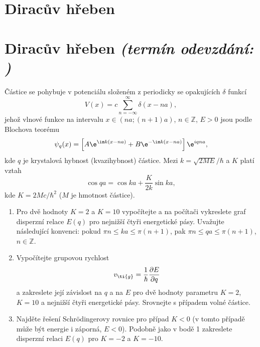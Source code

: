\documentclass[a4paper,11pt,twoside]{book}
\def\np{\newpage}
\newcommand{\exercise}[2][]{\ifthenelse{\isempty{#1}}
	{\np\section{#2}}
	{\np\section[#2]{{#2} \small{\it{(termín odevzdání: {#1})}}}}
}
\begin{document}
\exercise{Diracův hřeben}
    Částice se pohybuje v potenciálu složeném z periodicky se opakujících $\delta$ funkcí
    \begin{equation*}
        V(x)=c\sum_{n=-\infty}^{\infty}\delta(x-na),
    \end{equation*}
    jehož vlnové funkce na intervalu 
    $x\in\left(na; \left(n+1\right)a\right)$, $n\in\mathbb{Z}$, $E>0$ 
    jsou podle Blochova teorému
    \begin{equation*}
        \psi_{q}(x)
            =\left[A\e^{\im k\left(x-na\right)}+B\e^{-\im k\left(x-na\right)}\right]\e^{iqna},
    \end{equation*}
    kde $q$ je krystalová hybnost (kvazihybnost) částice.
    Mezi $k=\sqrt{2ME}/\hbar$ a $K$ platí vztah
    \begin{equation*}
        \cos{qa}=\cos{ka}+\frac{K}{2k}\sin{ka},
    \end{equation*}
    kde $K=2Mc/\hbar^{2}$ ($M$ je hmotnost částice).
    \begin{enumerate}
    \item 
        Pro dvě hodnoty $K=2$ a $K=10$ vypočítejte a na počítači vykreslete graf disperzní relace $E(q)$ pro nejnižší čtyři energetické pásy.
        Uvažujte následující konvenci: pokud $\pi n\leq ka\leq\pi(n+1)$, pak $\pi n\leq qa\leq\pi(n+1)$, $n\in\mathbb{Z}$.
    \item 
        Vypočítejte grupovou rychlost
        \begin{equation*}
            v_{\ti{g}}=\frac{1}{\hbar}\frac{\partial E}{\partial q}
        \end{equation*}
        a zakreslete její závislost na $q$ a na $E$ pro dvě hodnoty parametru $K=2$, $K=10$ a nejnižší čtyři energetické pásy.
        Srovnejte s případem volné částice.
    \item
        Najděte řešení Schrödingerovy rovnice pro případ $K<0$ (v tomto případě může být energie i záporná, $E<0$).
        Podobně jako v bodě 1 zakreslete disperzní relaci $E(q)$ pro $K=-2$ a $K=-10$.

    \end{enumerate}
\end{document}
